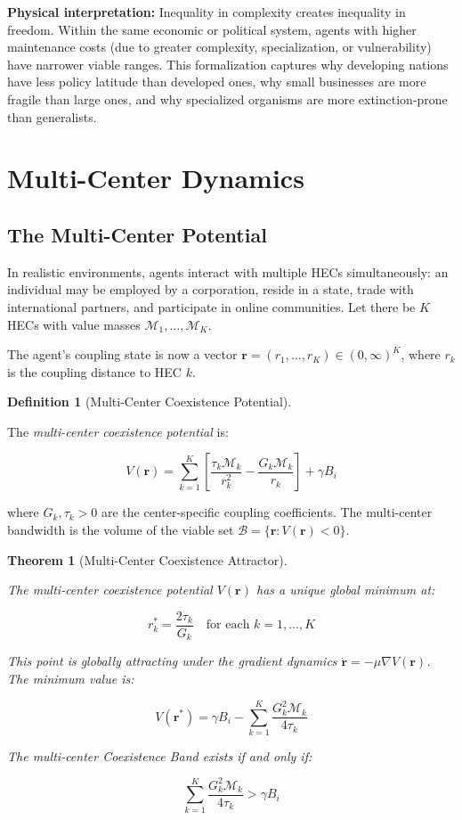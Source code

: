 \documentclass[11pt]{article}
\theoremstyle{plain}
\newtheorem{theorem}{Theorem}
\theoremstyle{definition}
\newtheorem{definition}{Definition}
\theoremstyle{remark}
\let\origsection\section
\renewcommand{\section}{\needspace{12\baselineskip}\origsection}
\let\origsubsection\subsection
\renewcommand{\subsection}{\needspace{7\baselineskip}\origsubsection}
\begin{document}
\textbf{Physical interpretation:} Inequality in complexity creates
inequality in freedom. Within the same economic or political system,
agents with higher maintenance costs (due to greater complexity,
specialization, or vulnerability) have narrower viable ranges. This
formalization captures why developing nations have less policy latitude
than developed ones, why small businesses are more fragile than large
ones, and why specialized organisms are more extinction-prone than
generalists.

\section{Multi-Center Dynamics}\label{multi-center-dynamics}

\subsection{The Multi-Center
Potential}\label{the-multi-center-potential}

In realistic environments, agents interact with multiple HECs
simultaneously: an individual may be employed by a corporation, reside
in a state, trade with international partners, and participate in online
communities. Let there be \(K\) HECs with value masses
\(\mathcal{M}_1, \ldots, \mathcal{M}_K\).

The agent's coupling state is now a vector
\(\mathbf{r} = (r_1, \ldots, r_K) \in (0, \infty)^K\), where \(r_k\) is
the coupling distance to HEC \(k\).

\begin{definition}[Multi-Center Coexistence Potential]
\label{def-multi-center-potential}

The \emph{multi-center coexistence potential} is:

$$V(\mathbf{r}) = \sum_{k=1}^{K} \left[\frac{\tau_k \mathcal{M}_k}{r_k^2} - \frac{G_k \mathcal{M}_k}{r_k}\right] + \gamma B_i$$

where $G_k, \tau_k > 0$ are the center-specific coupling coefficients. The multi-center bandwidth is the volume of the viable set $\mathcal{B} = \{\mathbf{r} : V(\mathbf{r}) < 0\}$.
\end{definition}

\begin{theorem}[Multi-Center Coexistence Attractor]
\label{thm-multi-center-attractor}

The multi-center coexistence potential $V(\mathbf{r})$ has a unique global minimum at:

$$r_k^* = \frac{2\tau_k}{G_k} \quad \text{for each } k = 1, \ldots, K$$

This point is globally attracting under the gradient dynamics $\dot{\mathbf{r}} = -\mu \nabla V(\mathbf{r})$. The minimum value is:

$$V(\mathbf{r}^*) = \gamma B_i - \sum_{k=1}^{K} \frac{G_k^2 \mathcal{M}_k}{4\tau_k}$$

The multi-center Coexistence Band exists if and only if:

$$\sum_{k=1}^{K} \frac{G_k^2 \mathcal{M}_k}{4\tau_k} > \gamma B_i$$
\end{theorem}
\end{document}

